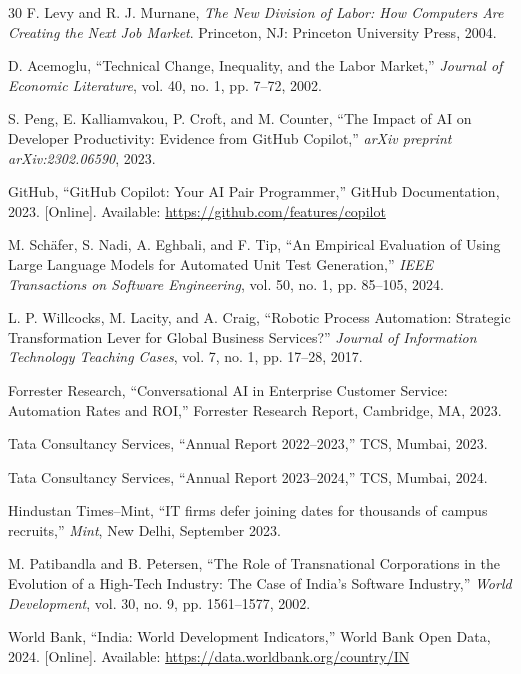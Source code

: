 \documentclass[conference]{IEEEtran}
\begin{document}
\begin{thebibliography}{30}
F. Levy and R. J. Murnane,
\textit{The New Division of Labor: How Computers Are Creating the Next Job Market}.
Princeton, NJ: Princeton University Press, 2004.

D. Acemoglu,
``Technical Change, Inequality, and the Labor Market,''
\textit{Journal of Economic Literature}, vol. 40, no. 1, pp. 7--72, 2002.

S. Peng, E. Kalliamvakou, P. Croft, and M. Counter,
``The Impact of AI on Developer Productivity: Evidence from GitHub Copilot,''
\textit{arXiv preprint arXiv:2302.06590}, 2023.

GitHub,
``GitHub Copilot: Your AI Pair Programmer,''
GitHub Documentation, 2023. [Online]. Available: \url{https://github.com/features/copilot}

M. Sch\"{a}fer, S. Nadi, A. Eghbali, and F. Tip,
``An Empirical Evaluation of Using Large Language Models for Automated Unit Test Generation,''
\textit{IEEE Transactions on Software Engineering}, vol. 50, no. 1, pp. 85--105, 2024.

L. P. Willcocks, M. Lacity, and A. Craig,
``Robotic Process Automation: Strategic Transformation Lever for Global Business Services?''
\textit{Journal of Information Technology Teaching Cases}, vol. 7, no. 1, pp. 17--28, 2017.

Forrester Research,
``Conversational AI in Enterprise Customer Service: Automation Rates and ROI,''
Forrester Research Report, Cambridge, MA, 2023.

Tata Consultancy Services,
``Annual Report 2022--2023,''
TCS, Mumbai, 2023.

Tata Consultancy Services,
``Annual Report 2023--2024,''
TCS, Mumbai, 2024.

Hindustan Times--Mint,
``IT firms defer joining dates for thousands of campus recruits,''
\textit{Mint}, New Delhi, September 2023.

M. Patibandla and B. Petersen,
``The Role of Transnational Corporations in the Evolution of a High-Tech Industry: The Case of India's Software Industry,''
\textit{World Development}, vol. 30, no. 9, pp. 1561--1577, 2002.

World Bank,
``India: World Development Indicators,''
World Bank Open Data, 2024. [Online]. Available: \url{https://data.worldbank.org/country/IN}


\end{thebibliography}
\end{document}
